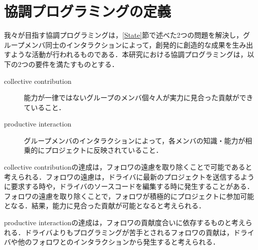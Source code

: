 \section{協調プログラミングの定義}

我々が目指す協調プログラミングは，\ref{State}節で述べた2つの問題を解決し，グループメンバ同士のインタラクションによって，創発的に創造的な成果を生み出すような活動が行われるものである．本研究における協調プログラミングは，以下の2つの要件を満たすものとする．


\begin{description}
	\item[collective contribution] 能力が一律ではないグループのメンバ個々人が実力に見合った貢献ができていること．
	\item[productive interaction] グループメンバのインタラクションによって，各メンバの知識・能力が相乗的にプロジェクトに反映されていること．
\end{description}


collective contributionの達成は，フォロワの遠慮を取り除くことで可能であると考えられる．フォロワの遠慮は，ドライバに最新のプロジェクトを送信するように要求する時や，ドライバのソースコードを編集する時に発生することがある．フォロワの遠慮を取り除くことで，フォロワが積極的にプロジェクトに参加可能となる．結果，能力に見合った貢献が可能となると考えられる．

productive interactionの達成は，フォロワの貢献度合いに依存するものと考えられる．ドライバよりもプログラミングが苦手とされるフォロワの貢献は，ドライバや他のフォロワとのインタラクションから発生すると考えられる．